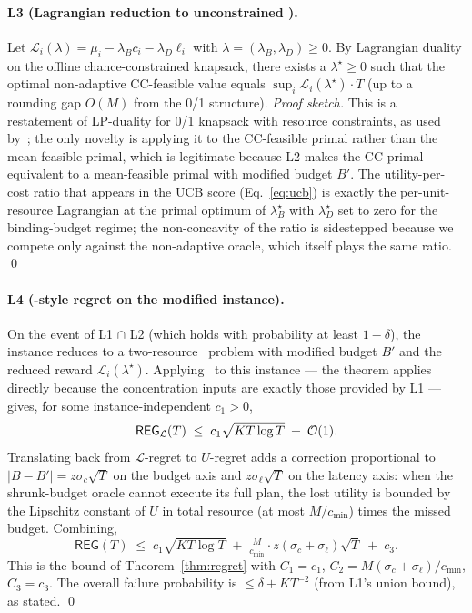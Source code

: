 \paragraph{L3 (Lagrangian reduction to unconstrained \BwK).}
Let $\mathcal{L}_i(\lambda) = \mu_i - \lambda_B c_i - \lambda_D \ell_i$
with $\lambda = (\lambda_B, \lambda_D) \ge 0$. By Lagrangian duality on
the offline chance-constrained knapsack, there exists a
$\lambda^\star \ge 0$ such that the optimal non-adaptive CC-feasible
value equals $\sup_i \mathcal{L}_i(\lambda^\star) \cdot T$
(up to a rounding gap $O(M)$ from the 0/1 structure). \emph{Proof
sketch.} This is a restatement of LP-duality for 0/1 knapsack with
resource constraints, as used by~\cite{agrawal2014bwk,bwk2018};
the only novelty is applying it to the CC-feasible primal rather than
the mean-feasible primal, which is legitimate because L2 makes the CC
primal equivalent to a mean-feasible primal with modified budget $B'$.
The utility-per-cost ratio that appears in the UCB score
(Eq.~\ref{eq:ucb}) is exactly the per-unit-resource Lagrangian at the
primal optimum of $\lambda^\star_B$ with $\lambda^\star_D$ set to
zero for the binding-budget regime; the non-concavity of the ratio is
sidestepped because we compete only against the non-adaptive oracle,
which itself plays the same ratio. \qed

\paragraph{L4 (\BwK-style regret on the modified instance).}
On the event of L1 $\cap$ L2 (which holds with probability at least
$1-\delta$), the instance reduces to a two-resource \BwK~problem with
modified budget $B'$ and the reduced reward $\mathcal{L}_i(\lambda^\star)$.
Applying~\cite[Thm.~4.1]{bwk2018} to this instance — the theorem
applies directly because the concentration inputs are exactly those
provided by L1 — gives, for some instance-independent $c_1 > 0$,
\[
  \mathsf{REG}_{\mathcal{L}}(T)
   \;\le\; c_1 \sqrt{K T \log T}
        \;+\; \mathcal{O}(1).
\]
Translating back from $\mathcal{L}$-regret to $U$-regret adds a
correction proportional to $|B - B'| = z\sigma_c\sqrt{T}$ on the budget
axis and $z\sigma_\ell\sqrt{T}$ on the latency axis: when the
shrunk-budget oracle cannot execute its full plan, the lost utility is
bounded by the Lipschitz constant of $U$ in total resource (at most
$M/c_{\min}$) times the missed budget. Combining,
\[
  \mathsf{REG}(T)
   \;\le\; c_1 \sqrt{K T \log T}
        \;+\; \tfrac{M}{c_{\min}} \cdot z(\sigma_c + \sigma_\ell)\sqrt{T}
        \;+\; c_3.
\]
This is the bound of Theorem~\ref{thm:regret} with
$C_1 = c_1$, $C_2 = M(\sigma_c + \sigma_\ell)/c_{\min}$, $C_3 = c_3$.
The overall failure probability is $\le \delta + KT^{-2}$ (from L1's
union bound), as stated. \qed

